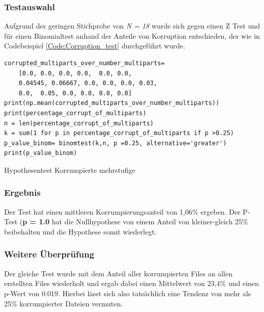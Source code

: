 \subsubsection{Testauswahl}
Aufgrund der geringen Stichprobe von \textit{N = 18} wurde sich gegen einen Z Test und für einen Binomialtest anhand der Anteile von Korruption entschieden, der wie in Codebeispiel \ref{Code:Corruption_test} durchgeführt wurde.

\begin{listing}
    \begin{verbatim}
corrupted_multiparts_over_number_multiparts= 
    [0.0, 0.0, 0.0, 0.0,  0.0, 0.0,
    0.04545, 0.06667, 0.0, 0.0, 0.0, 0.03,
    0.0,  0.05, 0.0, 0.0, 0.0, 0.0]
print(np.mean(corrupted_multiparts_over_number_multiparts))
print(percentage_corrupt_of_multiparts)
n = len(percentage_corrupt_of_multiparts)
k = sum(1 for p in percentage_corrupt_of_multiparts if p >0.25)
p_value_binom= binomtest(k,n, p =0.25, alternative='greater')
print(p_value_binom)
    \end{verbatim}
    \label{Code:Corruption_test}
    \caption{Hypothesentest Korrumpierte mehrstufige}
\end{listing}

\subsubsection{Ergebnis}
Der Test hat einen mittleren Korrumpierungsanteil von 1,06\% ergeben. Der P-Test (\textbf{p = 1.0} hat die Nullhypothese von einem Anteil von kleiner-gleich 25\% beibehalten und die Hypothese somit wiederlegt.

\subsubsection{Weitere Überprüfung}
Der gleiche Test wurde mit dem Anteil aller korrumpierten Files an allen erstellten Files wiederholt und ergab dabei einen Mittelwert von 23,4\% und einen p-Wert von 0.019. Hierbei lässt sich also tatsächlich eine Tendenz von mehr als 25\% korrumpierter Dateien vermuten.

% 

